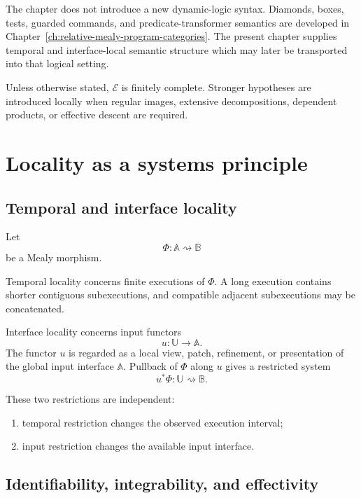 The chapter does not introduce a new dynamic-logic syntax. Diamonds, boxes,
tests, guarded commands, and predicate-transformer semantics are developed in
Chapter~\ref{ch:relative-mealy-program-categories}. The present chapter
supplies temporal and interface-local semantic structure which may later be
transported into that logical setting.

Unless otherwise stated, \(\mathcal E\) is finitely complete. Stronger
hypotheses are introduced locally when regular images, extensive
decompositions, dependent products, or effective descent are required.

\section{Locality as a systems principle}
\label{sec:locality-systems-principle}

\subsection{Temporal and interface locality}
\label{subsec:temporal-interface-locality}

Let
\[
    \Phi:\mathbb A\rightsquigarrow\mathbb B
\]
be a Mealy morphism.

Temporal locality concerns finite executions of \(\Phi\). A long execution
contains shorter contiguous subexecutions, and compatible adjacent
subexecutions may be concatenated.

Interface locality concerns input functors
\[
    u:\mathbb U\to\mathbb A.
\]
The functor \(u\) is regarded as a local view, patch, refinement, or
presentation of the global input interface \(\mathbb A\). Pullback of
\(\Phi\) along \(u\) gives a restricted system
\[
    u^\ast\Phi:\mathbb U\rightsquigarrow\mathbb B.
\]

These two restrictions are independent:
\begin{enumerate}
    \item temporal restriction changes the observed execution interval;
    \item input restriction changes the available input interface.
\end{enumerate}

\subsection{Identifiability, integrability, and effectivity}
\label{subsec:identifiability-integrability-effectivity}

